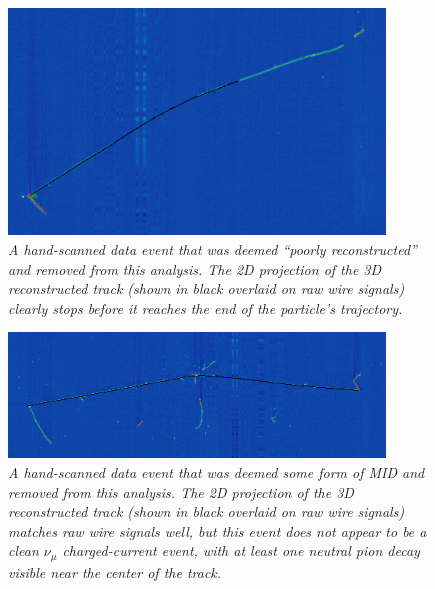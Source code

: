 \begin{figure}[ht!]
\begin{center}
\includegraphics[width=100mm]{Figures/static_figs/bad_evd_1.png}
\end{center}
\caption{\textit{A hand-scanned data event that was deemed ``poorly reconstructed'' and removed from this analysis. The 2D projection of the 3D reconstructed track (shown in black overlaid on raw wire signals) clearly stops before it reaches the end of the particle's trajectory.}}
\label{bad_evd_fig_1}
\end{figure}

\begin{figure}[ht!]
\begin{center}
\includegraphics[width=100mm]{Figures/static_figs/bad_evd_2.png}
\end{center}
\caption{\textit{A hand-scanned data event that was deemed some form of MID and removed from this analysis. The 2D projection of the 3D reconstructed track (shown in black overlaid on raw wire signals) matches raw wire signals well, but this event does not appear to be a clean $\nu_\mu$ charged-current event, with at least one neutral pion decay visible near the center of the track.}}
\label{bad_evd_fig_2}
\end{figure}

